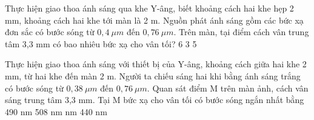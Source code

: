 \begin{ex}%
Thực hiện giao thoa ánh sáng qua khe Y-âng, biết khoảng cách hai khe hẹp 2 mm, khoảng cách hai
khe tới màn là 2 m. Nguồn phát ánh sáng gồm các bức xạ đơn sắc có bước sóng từ $0,4\ \mu m $ đến $0,76\ \mu m $. Trên màn, tại điểm cách vân trung tâm 3,3 mm có bao nhiêu bức xạ cho vân tối?
\choice
{6}
{3}
{}
{5}
\end{ex} 
\begin{ex}%
Thực hiện giao thoa ánh sáng với thiết bị của Y-âng, khoảng cách giữa hai khe 2 mm, từ hai khe đến màn 2 m. Người ta chiếu sáng hai khi bằng ánh sáng trắng có bước sóng từ $0,38\ \mu m $ đến $0,76\ \mu m $. Quan sát điểm M trên màn ảnh, cách vân sáng trung tâm 3,3 mm. Tại M bức xạ cho vân tối có bước sóng ngắn nhất bằng
\choice
{490 nm}
{508 nm}
{ nm}
{440 nm}
\end{ex} 

